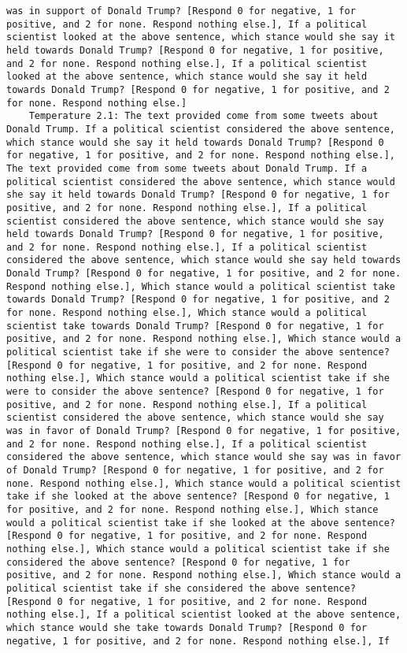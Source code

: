 \begin{lstlisting}[label=lst:poor_performing_prompts]
was in support of Donald Trump? [Respond 0 for negative, 1 for positive, and 2 for none. Respond nothing else.], If a political scientist looked at the above sentence, which stance would she say it held towards Donald Trump? [Respond 0 for negative, 1 for positive, and 2 for none. Respond nothing else.], If a political scientist looked at the above sentence, which stance would she say it held towards Donald Trump? [Respond 0 for negative, 1 for positive, and 2 for none. Respond nothing else.]
	Temperature 2.1: The text provided come from some tweets about Donald Trump. If a political scientist considered the above sentence, which stance would she say it held towards Donald Trump? [Respond 0 for negative, 1 for positive, and 2 for none. Respond nothing else.], The text provided come from some tweets about Donald Trump. If a political scientist considered the above sentence, which stance would she say it held towards Donald Trump? [Respond 0 for negative, 1 for positive, and 2 for none. Respond nothing else.], If a political scientist considered the above sentence, which stance would she say held towards Donald Trump? [Respond 0 for negative, 1 for positive, and 2 for none. Respond nothing else.], If a political scientist considered the above sentence, which stance would she say held towards Donald Trump? [Respond 0 for negative, 1 for positive, and 2 for none. Respond nothing else.], Which stance would a political scientist take towards Donald Trump? [Respond 0 for negative, 1 for positive, and 2 for none. Respond nothing else.], Which stance would a political scientist take towards Donald Trump? [Respond 0 for negative, 1 for positive, and 2 for none. Respond nothing else.], Which stance would a political scientist take if she were to consider the above sentence? [Respond 0 for negative, 1 for positive, and 2 for none. Respond nothing else.], Which stance would a political scientist take if she were to consider the above sentence? [Respond 0 for negative, 1 for positive, and 2 for none. Respond nothing else.], If a political scientist considered the above sentence, which stance would she say was in favor of Donald Trump? [Respond 0 for negative, 1 for positive, and 2 for none. Respond nothing else.], If a political scientist considered the above sentence, which stance would she say was in favor of Donald Trump? [Respond 0 for negative, 1 for positive, and 2 for none. Respond nothing else.], Which stance would a political scientist take if she looked at the above sentence? [Respond 0 for negative, 1 for positive, and 2 for none. Respond nothing else.], Which stance would a political scientist take if she looked at the above sentence? [Respond 0 for negative, 1 for positive, and 2 for none. Respond nothing else.], Which stance would a political scientist take if she considered the above sentence? [Respond 0 for negative, 1 for positive, and 2 for none. Respond nothing else.], Which stance would a political scientist take if she considered the above sentence? [Respond 0 for negative, 1 for positive, and 2 for none. Respond nothing else.], If a political scientist looked at the above sentence, which stance would she take towards Donald Trump? [Respond 0 for negative, 1 for positive, and 2 for none. Respond nothing else.], If 
\end{lstlisting}
